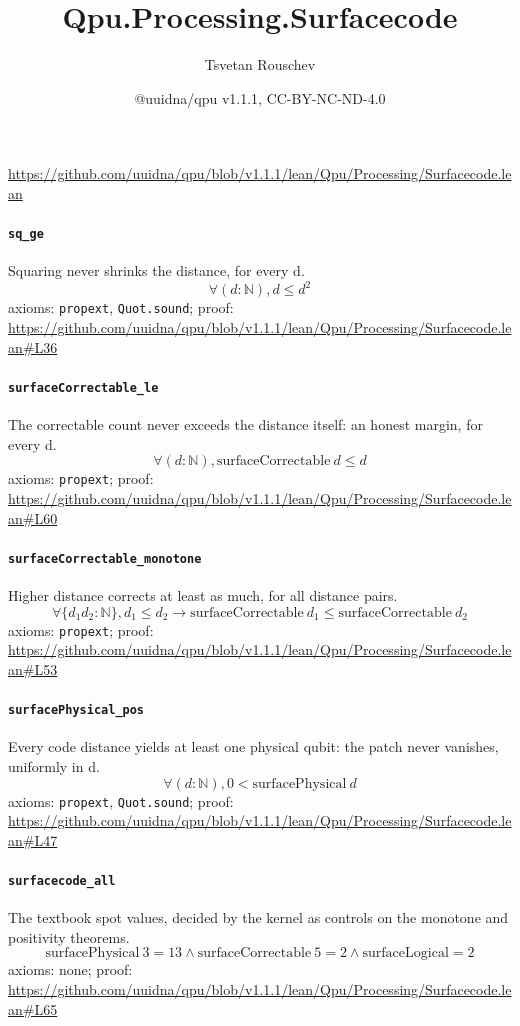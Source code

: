\documentclass[11pt]{article}
\title{Qpu.Processing.Surfacecode}
\author{Tsvetan Rouschev}
\date{@uuidna/qpu v1.1.1, CC-BY-NC-ND-4.0}
\begin{document}
\maketitle
\noindent\url{https://github.com/uuidna/qpu/blob/v1.1.1/lean/Qpu/Processing/Surfacecode.lean}

\paragraph{\texttt{sq\_ge}}
Squaring never shrinks the distance, for every d.
\[ \forall (d : \mathbb{N}), d \le d ^{2} \]
\noindent axioms: \texttt{propext}, \texttt{Quot.sound}; proof: \url{https://github.com/uuidna/qpu/blob/v1.1.1/lean/Qpu/Processing/Surfacecode.lean\#L36}

\paragraph{\texttt{surfaceCorrectable\_le}}
The correctable count never exceeds the distance itself: an honest margin, for every d.
\[ \forall (d : \mathbb{N}), \mathrm{surfaceCorrectable}\ d \le d \]
\noindent axioms: \texttt{propext}; proof: \url{https://github.com/uuidna/qpu/blob/v1.1.1/lean/Qpu/Processing/Surfacecode.lean\#L60}

\paragraph{\texttt{surfaceCorrectable\_monotone}}
Higher distance corrects at least as much, for all distance pairs.
\[ \forall \{d_{1} d_{2} : \mathbb{N}\}, d_{1} \le d_{2} \to \mathrm{surfaceCorrectable}\ d_{1} \le \mathrm{surfaceCorrectable}\ d_{2} \]
\noindent axioms: \texttt{propext}; proof: \url{https://github.com/uuidna/qpu/blob/v1.1.1/lean/Qpu/Processing/Surfacecode.lean\#L53}

\paragraph{\texttt{surfacePhysical\_pos}}
Every code distance yields at least one physical qubit: the patch never vanishes, uniformly in d.
\[ \forall (d : \mathbb{N}), 0 < \mathrm{surfacePhysical}\ d \]
\noindent axioms: \texttt{propext}, \texttt{Quot.sound}; proof: \url{https://github.com/uuidna/qpu/blob/v1.1.1/lean/Qpu/Processing/Surfacecode.lean\#L47}

\paragraph{\texttt{surfacecode\_all}}
The textbook spot values, decided by the kernel as controls on the monotone and positivity theorems.
\[ \mathrm{surfacePhysical}\ 3 = 13 \land \mathrm{surfaceCorrectable}\ 5 = 2 \land \mathrm{surfaceLogical} = 2 \]
\noindent axioms: none; proof: \url{https://github.com/uuidna/qpu/blob/v1.1.1/lean/Qpu/Processing/Surfacecode.lean\#L65}
\end{document}
